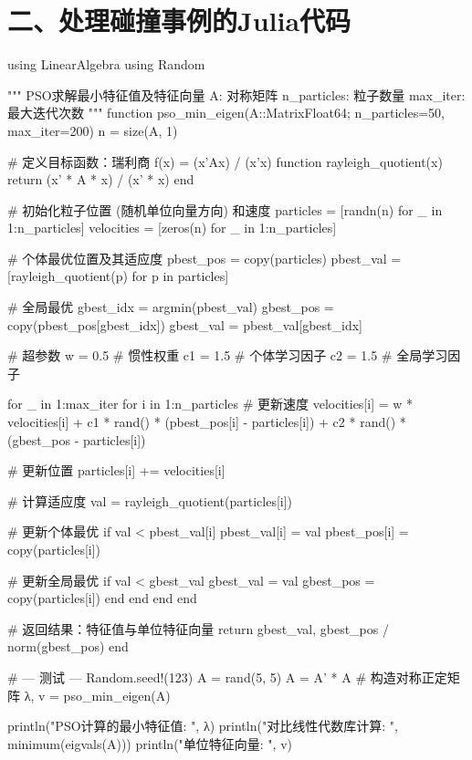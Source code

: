  \section*{二、处理碰撞事例的Julia代码}
 \begin{jllisting}[language={julia}, caption={一段Julia源代码}, label=code:3]
  using LinearAlgebra
using Random

"""
PSO求解最小特征值及特征向量
A: 对称矩阵
n_particles: 粒子数量
max_iter: 最大迭代次数
"""
function pso_min_eigen(A::Matrix{Float64}; n_particles=50, max_iter=200)
    n = size(A, 1)

    # 定义目标函数：瑞利商 f(x) = (x'Ax) / (x'x)
    function rayleigh_quotient(x)
        return (x' * A * x) / (x' * x)
    end

    # 初始化粒子位置 (随机单位向量方向) 和速度
    particles = [randn(n) for _ in 1:n_particles]
    velocities = [zeros(n) for _ in 1:n_particles]

    # 个体最优位置及其适应度
    pbest_pos = copy(particles)
    pbest_val = [rayleigh_quotient(p) for p in particles]

    # 全局最优
    gbest_idx = argmin(pbest_val)
    gbest_pos = copy(pbest_pos[gbest_idx])
    gbest_val = pbest_val[gbest_idx]

    # 超参数
    w = 0.5   # 惯性权重
    c1 = 1.5  # 个体学习因子
    c2 = 1.5  # 全局学习因子

    for _ in 1:max_iter
        for i in 1:n_particles
            # 更新速度
            velocities[i] = w * velocities[i] + 
                            c1 * rand() * (pbest_pos[i] - particles[i]) + 
                            c2 * rand() * (gbest_pos - particles[i])

            # 更新位置
            particles[i] += velocities[i]

            # 计算适应度
            val = rayleigh_quotient(particles[i])

            # 更新个体最优
            if val < pbest_val[i]
                pbest_val[i] = val
                pbest_pos[i] = copy(particles[i])

                # 更新全局最优
                if val < gbest_val
                    gbest_val = val
                    gbest_pos = copy(particles[i])
                end
            end
        end
    end

    # 返回结果：特征值与单位特征向量
    return gbest_val, gbest_pos / norm(gbest_pos)
end

# --- 测试 ---
Random.seed!(123)
A = rand(5, 5)
A = A' * A # 构造对称正定矩阵
λ, v = pso_min_eigen(A)

println("PSO计算的最小特征值: ", λ)
println("对比线性代数库计算: ", minimum(eigvals(A)))
println("单位特征向量: ", v)
\end{jllisting}


